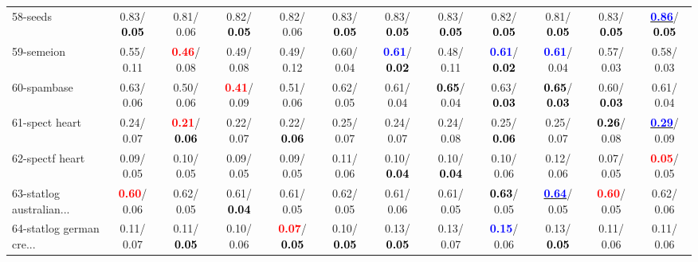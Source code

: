 \begin{table}[h]
\begin{center}
{\begin{tabular}{lc|c|c|c|c|c|c|c|c|c|c}
58-seeds &   0.83/\textcolor{black}{\textbf{  0.05}} &   0.81/  0.06 &   0.82/\textcolor{black}{\textbf{  0.05}} &   0.82/  0.06 &   0.83/\textcolor{black}{\textbf{  0.05}} &   0.83/\textcolor{black}{\textbf{  0.05}} &   0.83/\textcolor{black}{\textbf{  0.05}} &   0.82/\textcolor{black}{\textbf{  0.05}} &   0.81/\textcolor{black}{\textbf{  0.05}} &   0.83/\textcolor{black}{\textbf{  0.05}} & \underline{\textcolor{blue}{\textbf{  0.86}}}/\textcolor{black}{\textbf{  0.05}} \\
59-semeion &   0.55/  0.11 & \textcolor{red}{\textbf{  0.46}}/  0.08 &   0.49/  0.08 &   0.49/  0.12 &   0.60/  0.04 & \textcolor{blue}{\textbf{  0.61}}/\textcolor{black}{\textbf{  0.02}} &   0.48/  0.11 & \textcolor{blue}{\textbf{  0.61}}/\textcolor{black}{\textbf{  0.02}} & \textcolor{blue}{\textbf{  0.61}}/  0.04 &   0.57/  0.03 &   0.58/  0.03 \\
60-spambase &   0.63/  0.06 &   0.50/  0.06 & \textcolor{red}{\textbf{  0.41}}/  0.09 &   0.51/  0.06 &   0.62/  0.05 &   0.61/  0.04 & \textcolor{black}{\textbf{  0.65}}/  0.04 &   0.63/\textcolor{black}{\textbf{  0.03}} & \textcolor{black}{\textbf{  0.65}}/\textcolor{black}{\textbf{  0.03}} &   0.60/\textcolor{black}{\textbf{  0.03}} &   0.61/  0.04 \\ \hline
61-spect heart &   0.24/  0.07 & \textcolor{red}{\textbf{  0.21}}/\textcolor{black}{\textbf{  0.06}} &   0.22/  0.07 &   0.22/\textcolor{black}{\textbf{  0.06}} &   0.25/  0.07 &   0.24/  0.07 &   0.24/  0.08 &   0.25/\textcolor{black}{\textbf{  0.06}} &   0.25/  0.07 & \textcolor{black}{\textbf{  0.26}}/  0.08 & \underline{\textcolor{blue}{\textbf{  0.29}}}/  0.09 \\
62-spectf heart &   0.09/  0.05 &   0.10/  0.05 &   0.09/  0.05 &   0.09/  0.05 &   0.11/  0.06 &   0.10/\textcolor{black}{\textbf{  0.04}} &   0.10/\textcolor{black}{\textbf{  0.04}} &   0.10/  0.06 &   0.12/  0.06 &   0.07/  0.05 & \textcolor{red}{\textbf{  0.05}}/  0.05 \\
63-statlog australian... & \textcolor{red}{\textbf{  0.60}}/  0.06 &   0.62/  0.05 &   0.61/\textcolor{black}{\textbf{  0.04}} &   0.61/  0.05 &   0.62/  0.05 &   0.61/  0.06 &   0.61/  0.05 & \textcolor{black}{\textbf{  0.63}}/  0.05 & \underline{\textcolor{blue}{\textbf{  0.64}}}/  0.05 & \textcolor{red}{\textbf{  0.60}}/  0.05 &   0.62/  0.06 \\
64-statlog german cre... &   0.11/  0.07 &   0.11/\textcolor{black}{\textbf{  0.05}} &   0.10/  0.06 & \textcolor{red}{\textbf{  0.07}}/\textcolor{black}{\textbf{  0.05}} &   0.10/\textcolor{black}{\textbf{  0.05}} &   0.13/\textcolor{black}{\textbf{  0.05}} &   0.13/  0.07 & \textcolor{blue}{\textbf{  0.15}}/  0.06 &   0.13/\textcolor{black}{\textbf{  0.05}} &   0.11/  0.06 &   0.11/  0.06 \\\end{tabular}
}\label{strats1bSVM}
\end{center}
\end{table}
